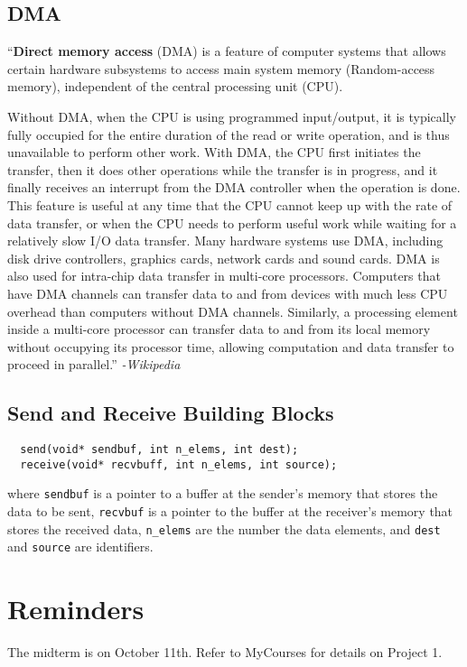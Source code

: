 \documentclass[letterpaper, 12pt]{math}
\begin{document}
\subsection*{DMA}
``\textbf{Direct memory access} (DMA) is a feature of computer systems that
allows certain hardware subsystems to access main system memory (Random-access
memory), independent of the central processing unit (CPU). \par
Without DMA, when the CPU is using programmed input/output, it is typically
fully occupied for the entire duration of the read or write operation, and is
thus unavailable to perform other work. With DMA, the CPU first initiates the
transfer, then it does other operations while the transfer is in progress, and
it finally receives an interrupt from the DMA controller when the operation is
done. This feature is useful at any time that the CPU cannot keep up with the
rate of data transfer, or when the CPU needs to perform useful work while
waiting for a relatively slow I/O data transfer. Many hardware systems use
DMA, including disk drive controllers, graphics cards, network cards and
sound cards. DMA is also used for intra-chip data transfer in multi-core
processors. Computers that have DMA channels can transfer data to and from
devices with much less CPU overhead than computers without DMA channels.
Similarly, a processing element inside a multi-core processor can transfer
data to and from its local memory without occupying its processor time,
allowing computation and data transfer to proceed in parallel.''
\textit{-Wikipedia}

\subsection*{Send and Receive Building Blocks}
\begin{lstlisting}
  send(void* sendbuf, int n_elems, int dest);
  receive(void* recvbuff, int n_elems, int source);
\end{lstlisting}
where \texttt{sendbuf} is a pointer to a buffer at the sender's memory that
stores the data to be sent, \texttt{recvbuf} is a pointer to the buffer at
the receiver's memory that stores the received data, \texttt{n\_elems} are
the number the data elements, and \texttt{dest} and \texttt{source} are
identifiers.

\section*{Reminders}
The midterm is on October 11th.
Refer to MyCourses for details on Project 1. \\
\end{document}
